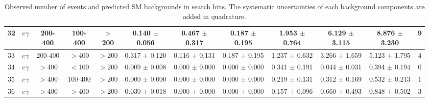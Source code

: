 \documentclass[thesis.tex]{subfiles}
\renewcommand\_{\textunderscore\allowbreak}
\begin{document}
\begin{table}[hbtp]
{\begin{tabular}{|c|c|c|c|c|c|c|c|c|c||c|c|}
 32&  $e\gamma$     & 200-400 & 100-400 & $>$200  &     0.140 $\pm$ 0.056  &   0.467 $\pm$ 0.317 &   0.187 $\pm$ 0.195  &   1.953 $\pm$  0.764 &   6.129 $\pm$  3.115 &   8.876 $\pm$   3.230  &   9\\ \hline
 33&  $e\gamma$     & 200-400 & $>$400  & $>$200  &     0.317 $\pm$ 0.120  &   0.116 $\pm$ 0.131 &   0.187 $\pm$ 0.195  &   1.237 $\pm$  0.632 &   3.266 $\pm$  1.659 &   5.123 $\pm$   1.795  &   4\\ \hline
 34&  $e\gamma$     & $>$400 & $<$100   & $>$200  &     0.009 $\pm$ 0.008  &   0.000 $\pm$ 0.000 &   0.000 $\pm$ 0.000  &   0.341 $\pm$  0.191 &   0.044 $\pm$  0.031 &   0.394 $\pm$   0.194  &   0\\ \hline
 35&  $e\gamma$     & $>$400 & 100-400  & $>$200  &     0.000 $\pm$ 0.000  &   0.000 $\pm$ 0.000 &   0.000 $\pm$ 0.000  &   0.219 $\pm$  0.131 &   0.312 $\pm$  0.169 &   0.532 $\pm$   0.213  &   1\\ \hline
 36&  $e\gamma$     & $>$400 & $>$400   & $>$200  &     0.030 $\pm$ 0.018  &   0.000 $\pm$ 0.000 &   0.000 $\pm$ 0.000  &   0.157 $\pm$  0.096 &   0.660 $\pm$  0.493 &   0.848 $\pm$   0.502  &   3\\ \hline
 \end{tabular}
 }
 \caption{Observed number of events and predicted SM backgrounds in search bins. The systematic uncertainties of each background components are added in quadrature.}
 \label{tab:unblindeddata}
 \end{table}    
\end{document}
